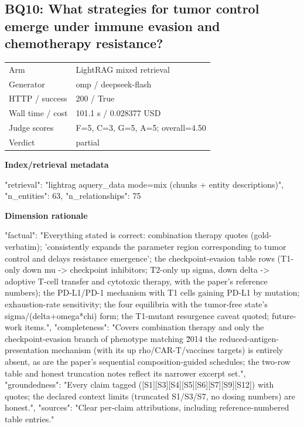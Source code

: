 \documentclass[10pt]{article}
\begin{document}
\subsection{BQ10: What strategies for tumor control emerge under immune evasion and chemotherapy resistance?}
\begin{tabular}{@{}ll@{}}
Arm & LightRAG mixed retrieval\\
Generator & omp / deepseek-flash\\
HTTP / success & 200 / True\\
Wall time / cost & 101.1 s / 0.028377 USD\\
Judge scores & F=5, C=3, G=5, A=5; overall=4.50\\
Verdict & partial\\
\end{tabular}

\textbf{Index/retrieval metadata}
\begin{EvidenceText}
{
  "retrieval": "lightrag aquery_data mode=mix (chunks + entity descriptions)",
  "n_entities": 63,
  "n_relationships": 75
}
\end{EvidenceText}

\textbf{Dimension rationale}
\begin{EvidenceText}
{
  "factual": "Everything stated is correct: combination therapy quotes (gold-verbatim); 'consistently expands the parameter region corresponding to tumor control and delays resistance emergence'; the checkpoint-evasion table rows (T1-only down mu -> checkpoint inhibitors; T2-only up sigma, down delta -> adoptive T-cell transfer and cytotoxic therapy, with the paper's reference numbers); the PD-L1/PD-1 mechanism with T1 cells gaining PD-L1 by mutation; exhaustion-rate sensitivity; the four equilibria with the tumor-free state's sigma/(delta+omega*chi) form; the T1-mutant resurgence caveat quoted; future-work items.",
  "completeness": "Covers combination therapy and only the checkpoint-evasion branch of phenotype matching \u2014 the reduced-antigen-presentation mechanism (with its up rho/CAR-T/vaccines targets) is entirely absent, as are the paper's sequential composition-guided schedules; the two-row table and honest truncation notes reflect its narrower excerpt set.",
  "groundedness": "Every claim tagged ([S1][S3][S4][S5][S6][S7][S9][S12]) with quotes; the declared context limits (truncated S1/S3/S7, no dosing numbers) are honest.",
  "sources": "Clear per-claim attributions, including reference-numbered table entries."
}
\end{EvidenceText}
\end{document}
